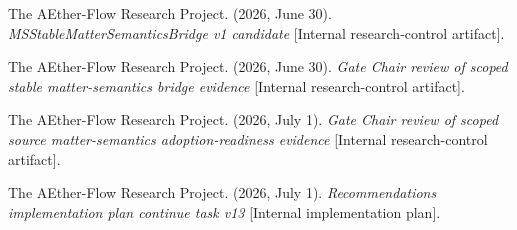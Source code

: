 \documentclass[11pt]{article}
\begin{document}
The AEther-Flow Research Project. (2026, June 30). \textit{MSStableMatterSemanticsBridge
v1 candidate} [Internal research-control artifact].

The AEther-Flow Research Project. (2026, June 30). \textit{Gate Chair review
of scoped stable matter-semantics bridge evidence} [Internal research-control
artifact].

The AEther-Flow Research Project. (2026, July 1). \textit{Gate Chair review of
scoped source matter-semantics adoption-readiness evidence} [Internal
research-control artifact].

The AEther-Flow Research Project. (2026, July 1). \textit{Recommendations
implementation plan continue task v13} [Internal implementation plan].
\end{document}
